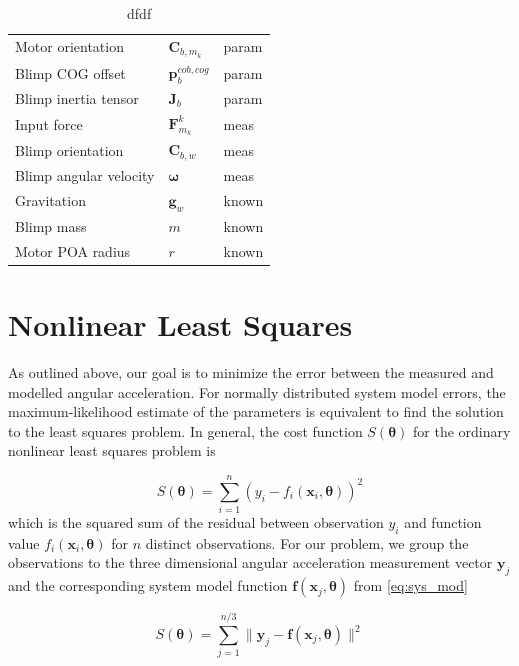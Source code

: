 \begin{table}[htb!]
\label{tab:params_updated}
\centering
\begin{tabular}{lll}
\hline
Motor orientation & $\mathbf{C}_{b,m_k}$ & param \\
Blimp COG offset & $\mathbf{p}^{cob,cog}_b$ & param \\
Blimp inertia tensor & $\mathbf{J}_b$ & param \\
Input force & $\mathbf{F}_{m_k}^k$ & meas \\
Blimp orientation & $\mathbf{C}_{b,w}$ & meas \\
Blimp angular velocity & $\boldsymbol{\omega}$ & meas \\
Gravitation & $\mathbf{g}_w$ & known \\
Blimp mass & $m$ & known \\
Motor POA radius & $r$ & known \\
\hline
\end{tabular}
\caption{dfdf}
\end{table}


\section{Nonlinear Least Squares}
As outlined above, our goal is to minimize the error between the measured and modelled angular acceleration.
For normally distributed system model errors, the maximum-likelihood estimate of the parameters \citep{Seber} is equivalent to find the solution to the least squares problem.
In general, the cost function $S(\boldsymbol{\theta})$ for the ordinary nonlinear least squares problem is

\begin{equation}
S(\boldsymbol{\theta}) = \sum_{i=1}^n ( y_i - f_i(\mathbf{x}_i, \boldsymbol{\theta}) )^2
\end{equation}
which is the squared sum of the residual between observation $y_i$ and function value $f_i(\mathbf{x}_i, \boldsymbol{\theta})$ for $n$ distinct observations.
For our problem, we group the observations to the three dimensional angular acceleration measurement vector $\mathbf{y}_j$ and the corresponding system model function $\mathbf{f}(\mathbf{x}_j, \boldsymbol{\theta})$ from \eqref{eq:sys_mod}

\begin{equation}
S(\boldsymbol{\theta}) = \sum_{j=1}^{n/3} \| \mathbf{y}_j - \mathbf{f}(\mathbf{x}_j, \boldsymbol{\theta}) \|^2
\end{equation}

